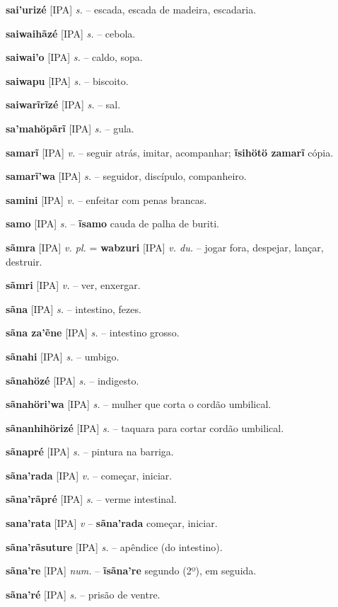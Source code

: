 \textbf{sai'urizé} [IPA] \textit{s.} -- escada, escada de madeira, escadaria.

\textbf{saiwaihãzé} [IPA] \textit{s.} -- cebola.

\textbf{saiwai'o} [IPA] \textit{s.} -- caldo, sopa.

\textbf{saiwapu} [IPA] \textit{s.} -- biscoito.

\textbf{saiwarĩrĩzé} [IPA] \textit{s.} -- sal.

\textbf{sa'mahöpãrĩ} [IPA] \textit{s.} -- gula.

\textbf{samarĩ} [IPA] \textit{v.} -- seguir atrás, imitar, acompanhar; \textbf{ĩsihötö zamarĩ} cópia.

\textbf{samarĩ'wa} [IPA] \textit{s.} -- seguidor, discípulo, companheiro.

\textbf{samini} [IPA] \textit{v.} -- enfeitar com penas brancas.

\textbf{samo} [IPA] \textit{s.} -- \textbf{ĩsamo} cauda de palha de buriti.

\textbf{sãmra} [IPA] \textit{v. pl.} = \textbf{wabzuri} [IPA] \textit{v. du.} -- jogar fora, despejar, lançar, destruir.

\textbf{sãmri} [IPA] \textit{v.} -- ver, enxergar.

\textbf{sãna} [IPA] \textit{s.} -- intestino, fezes.

\textbf{sãna za'ẽne} [IPA] \textit{s.} -- intestino grosso.

\textbf{sãnahi} [IPA] \textit{s.} -- umbigo.

\textbf{sãnahözé} [IPA] \textit{s.} -- indigesto.

\textbf{sãnahöri'wa} [IPA] \textit{s.} -- mulher que corta o cordão umbilical.

\textbf{sãnanhihörizé} [IPA] \textit{s.} -- taquara para cortar cordão umbilical.

\textbf{sãnapré} [IPA] \textit{s.} -- pintura na barriga.

\textbf{sãna'rada} [IPA] \textit{v.} -- começar, iniciar.

\textbf{sãna'rãpré} [IPA] \textit{s.} -- verme intestinal.

\textbf{sana'rata} [IPA] \textit{v} -- \textbf{sãna'rada} começar, iniciar.

\textbf{sãna'rãsuture} [IPA] \textit{s.} -- apêndice (do intestino).

\textbf{sãna're} [IPA] \textit{num.} -- \textbf{ĩsãna're} segundo (2º), em seguida.

\textbf{sãna'ré} [IPA] \textit{s.} -- prisão de ventre.

